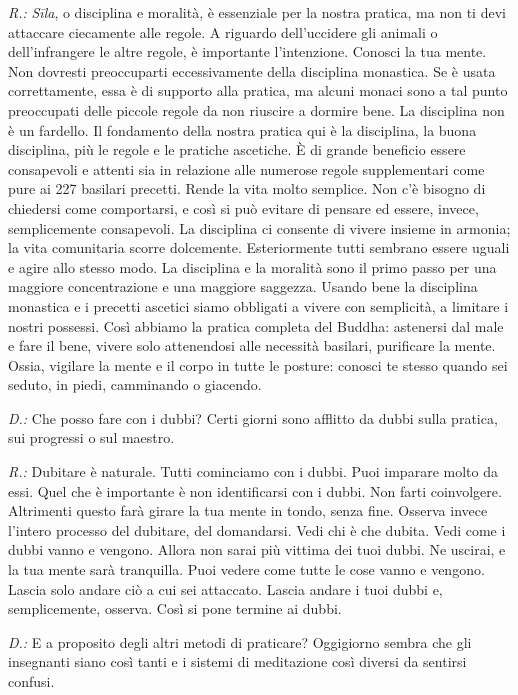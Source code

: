 \emph{R.:} \emph{Sīla}, o disciplina e moralità, è essenziale per la nostra
pratica, ma non ti devi attaccare ciecamente alle regole. A riguardo
dell'uccidere gli animali o dell'infrangere le altre regole, è
importante l'intenzione. Conosci la tua mente. Non dovresti preoccuparti
eccessivamente della disciplina monastica. Se è usata correttamente,
essa è di supporto alla pratica, ma alcuni monaci sono a tal punto
preoccupati delle piccole regole da non riuscire a dormire bene. La
disciplina non è un fardello. Il fondamento della nostra pratica qui è
la disciplina, la buona disciplina, più le regole e le pratiche
ascetiche. È di grande beneficio essere consapevoli e attenti sia in
relazione alle numerose regole supplementari come pure ai 227 basilari
precetti. Rende la vita molto semplice. Non c'è bisogno di chiedersi
come comportarsi, e così si può evitare di pensare ed essere, invece,
semplicemente consapevoli. La disciplina ci consente di vivere insieme
in armonia; la vita comunitaria scorre dolcemente. Esteriormente tutti
sembrano essere uguali e agire allo stesso modo. La disciplina e la
moralità sono il primo passo per una maggiore concentrazione e una
maggiore saggezza. Usando bene la disciplina monastica e i precetti
ascetici siamo obbligati a vivere con semplicità, a limitare i nostri
possessi. Così abbiamo la pratica completa del Buddha: astenersi dal
male e fare il bene, vivere solo attenendosi alle necessità basilari,
purificare la mente. Ossia, vigilare la mente e il corpo in tutte le
posture: conosci te stesso quando sei seduto, in piedi, camminando o
giacendo.

\emph{D.:} Che posso fare con i dubbi? Certi giorni sono afflitto da dubbi
sulla pratica, sui progressi o sul maestro.

\emph{R.:} Dubitare è naturale. Tutti cominciamo con i dubbi. Puoi imparare
molto da essi. Quel che è importante è non identificarsi con i dubbi.
Non farti coinvolgere. Altrimenti questo farà girare la tua mente in
tondo, senza fine. Osserva invece l'intero processo del dubitare, del
domandarsi. Vedi chi è che dubita. Vedi come i dubbi vanno e vengono.
Allora non sarai più vittima dei tuoi dubbi. Ne uscirai, e la tua mente
sarà tranquilla. Puoi vedere come tutte le cose vanno e vengono. Lascia
solo andare ciò a cui sei attaccato. Lascia andare i tuoi dubbi e,
semplicemente, osserva. Così si pone termine ai dubbi.

\emph{D.:} E a proposito degli altri metodi di praticare? Oggigiorno sembra che
gli insegnanti siano così tanti e i sistemi di meditazione così diversi
da sentirsi confusi.

